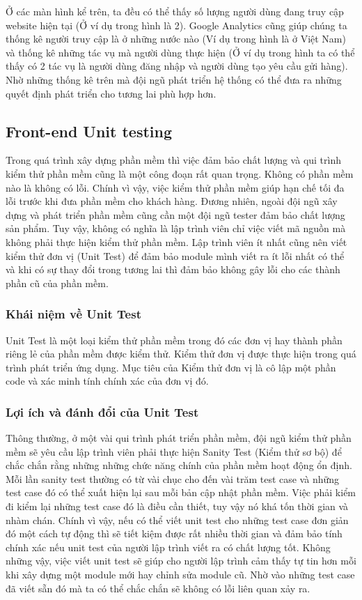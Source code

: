 			 	Ở các màn hình kể trên, ta đều có thể thấy số lượng người dùng đang truy cập website hiện tại (Ở ví dụ trong hình là 2). Google Analytics cũng giúp chúng ta thống kê người truy cập là ở những nước nào (Ví dụ trong hình là ở Việt Nam) và thống kê những tác vụ mà người dùng thực hiện (Ở ví dụ trong hình ta có thể thấy có 2 tác vụ là người dùng đăng nhập và người dùng tạo yêu cầu gửi hàng). Nhờ những thống kê trên mà đội ngũ phát triển hệ thống có thể đưa ra những quyết định phát triển cho tương lai phù hợp hơn.
			 	
			 	\subsection{Front-end Unit testing}
			 	Trong quá trình xây dựng phần mềm thì việc đảm bảo chất lượng và qui trình kiểm thử phần mềm cũng là một công đoạn rất quan trọng. Không có phần mềm nào là không có lỗi. Chính vì vậy, việc kiểm thử phần mềm giúp hạn chế tối đa lỗi trước khi đưa phần mềm cho khách hàng. Đương nhiên, ngoài đội ngũ xây dựng và phát triển phần mềm cũng cần một đội ngũ tester đảm bảo chất lượng sản phẩm. Tuy vậy, không có nghĩa là lập trình viên chỉ việc viết mã nguồn mà không phải thực hiện kiểm thử phần mềm. Lập trình viên ít nhất cũng nên viết kiểm thử đơn vị (Unit Test) để đảm bảo module mình viết ra ít lỗi nhất có thể và khi có sự thay đổi trong tương lai thì đảm bảo không gây lỗi cho các thành phần cũ của phần mềm.
			 	
			 	\subsubsection{Khái niệm về Unit Test}
			 	Unit Test là một loại kiểm thử phần mềm trong đó các đơn vị hay thành phần riêng lẻ của phần mềm được kiểm thử. Kiểm thử đơn vị được thực hiện trong quá trình phát triển ứng dụng. Mục tiêu của Kiểm thử đơn vị là cô lập một phần code và xác minh tính chính xác của đơn vị đó.
			 	
			 	\subsubsection{Lợi ích và đánh đổi của Unit Test}
			 	Thông thường, ở một vài qui trình phát triển phần mềm, đội ngũ kiểm thử phần mềm sẽ yêu cầu lập trình viên phải thực hiện Sanity Test (Kiểm thử sơ bộ) để chắc chắn rằng những những chức năng chính của phần mềm hoạt động ổn định. Mỗi lần sanity test thường có từ vài chục cho đến vài trăm test case và những test case đó có thể xuất hiện lại sau mỗi bản cập nhật phần mềm. Việc phải kiểm đi kiểm lại những test case đó là điều cần thiết, tuy vậy nó khá tốn thời gian và nhàm chán. Chính vì vậy, nếu có thể viết unit test cho những test case đơn giản đó một cách tự động thì sẽ tiết kiệm được rất nhiều thời gian và đảm bảo tính chính xác nếu unit test của người lập trình viết ra có chất lượng tốt. Không những vậy, việc viết unit test sẽ giúp cho người lập trình cảm thấy tự tin hơn mỗi khi xây dựng một module mới hay chỉnh sửa module cũ. Nhờ vào những test case đã viết sẵn đó mà ta có thể chắc chắn sẽ không có lỗi liên quan xảy ra.\\
			 	
